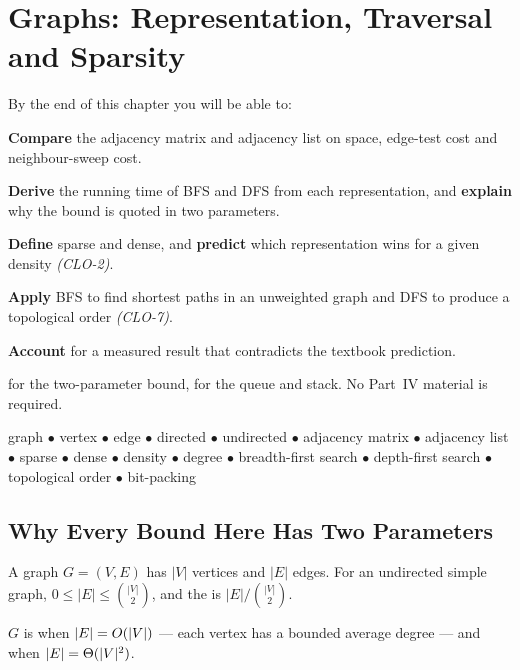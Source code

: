 \chapter{Graphs: Representation, Traversal and Sparsity}\label{ch:graphs}

\begin{outcomes}
By the end of this chapter you will be able to:
\begin{tight}
  \item \textbf{Compare} the adjacency matrix and adjacency list on space,
        edge-test cost and neighbour-sweep cost.
  \item \textbf{Derive} the running time of BFS and DFS from each
        representation, and \textbf{explain} why the bound is quoted in two
        parameters.
  \item \textbf{Define} sparse and dense, and \textbf{predict} which
        representation wins for a given density \emph{(CLO-2)}.
  \item \textbf{Apply} BFS to find shortest paths in an unweighted graph and
        DFS to produce a topological order \emph{(CLO-7)}.
  \item \textbf{Account} for a measured result that contradicts the textbook
        prediction.
\end{tight}
\end{outcomes}

\begin{prereq}
 for the two-parameter bound,  for the queue and
stack. No Part~IV material is required.
\end{prereq}

\begin{keyterms}
graph $\bullet$ vertex $\bullet$ edge $\bullet$ directed $\bullet$ undirected
$\bullet$ adjacency matrix $\bullet$ adjacency list $\bullet$ sparse $\bullet$
dense $\bullet$ density $\bullet$ degree $\bullet$ breadth-first search
$\bullet$ depth-first search $\bullet$ topological order $\bullet$ bit-packing
\end{keyterms}

\section{Why Every Bound Here Has Two Parameters}

\begin{definitionbox}
A graph $G = (V, E)$ has $|V|$ vertices and $|E|$ edges. For an undirected
simple graph, $0 \le |E| \le \binom{|V|}{2}$, and the  is
$|E| / \binom{|V|}{2}$.

\smallskip
$G$ is  when $|E| = O(|V|)$ --- each vertex has a bounded
average degree --- and  when $|E| = \Theta(|V|^{2})$.
\end{definitionbox}

